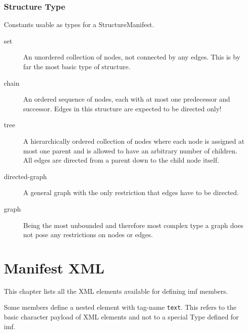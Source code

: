 \documentclass[11pt,a4paper]{report}
\newcommand{\imfType}[1]{\texttt{\imfns#1}}
\begin{document}
\subsection{Structure Type}
Constants usable as types for a StructureManifest.
\label{sec:enum-structure-type}
\begin{description}
	\item[set] An unordered collection of nodes, not connected by any edges. This is by far the most basic type of structure.
	\item[chain] An ordered sequence of nodes, each with at most one predecessor and successor. Edges in this structure are expected to be directed only!
	\item[tree] A hierarchically ordered collection of nodes where each node is assigned at most one parent and is allowed to have an arbitrary number of children. All edges are directed from a parent down to the child node itself.
	\item[directed-graph] A general graph with the only restriction that edges have to be directed.
	\item[graph] Being the most unbounded and therefore most complex type a graph does not pose any restrictions on nodes or edges.
\end{description}

\chapter{Manifest XML}
\label{chap:xml}

This chapter lists all the XML elements available for defining \ac{imf} members.

Some members define a nested element with tag-name \imfType{text}.
This refers to the basic character payload of XML elements and not to a special Type defined for \ac{imf}.

\end{document}
